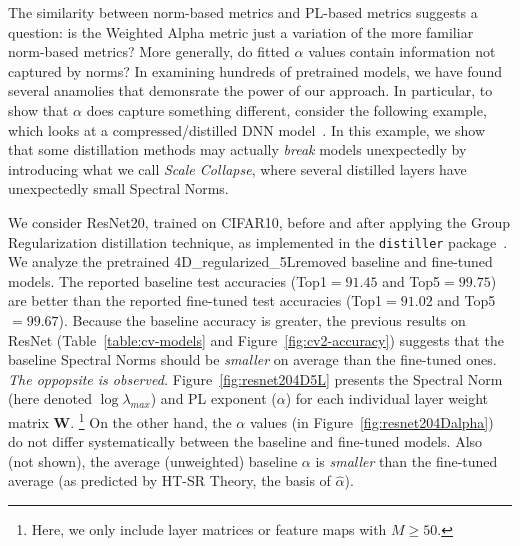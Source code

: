 The similarity between norm-based metrics and PL-based metrics suggests a question: is the Weighted Alpha metric just a variation of the more familiar norm-based metrics?  %
More generally, do fitted $\alpha$ values contain information not captured by norms? 
In examining hundreds of pretrained models, we have found several anamolies that demonsrate the power of our approach.
In particular, to show that $\alpha$ does capture something different, consider the following example, which looks at a compressed/distilled DNN model~\cite{CWZZ17_TR}.
In this example, we show that some distillation methods may actually \emph{break} models unexpectedly by introducing what we call \emph{Scale Collapse}, where several distilled layers have unexpectedly small Spectral Norms.

We consider ResNet20, trained on CIFAR10, before and after applying the Group Regularization distillation technique, as implemented in the \texttt{distiller} package~\cite{distiller}.
We analyze the pretrained 4D\_regularized\_5Lremoved baseline and fine-tuned models. 
The reported baseline test accuracies (Top1$=91.45$ and Top5$=99.75$) are better than the reported fine-tuned test accuracies (Top1$=91.02$ and Top5$=99.67$).  Because the baseline accuracy is greater,  the previous results on ResNet (Table~\ref{table:cv-models} and Figure~\ref{fig:cv2-accuracy}) suggests that the baseline Spectral Norms should be \emph{smaller} on average than the fine-tuned ones. \emph{The oppopsite is observed.}
Figure~\ref{fig:resnet204D5L} presents the Spectral Norm (here denoted $\log\lambda_{max}$) and PL exponent ($\alpha$) for each individual layer weight matrix $\mathbf{W}$.%
\footnote{Here, we only include layer matrices or feature maps with $M\ge50$.}
On the other hand, the $\alpha$ values (in Figure~\ref{fig:resnet204Dalpha}) do not differ systematically between the baseline and fine-tuned models.
Also (not shown), the average (unweighted) baseline $\alpha$ is \emph{smaller} than the fine-tuned average (as predicted by HT-SR Theory, the basis of $\hat{\alpha}$).

